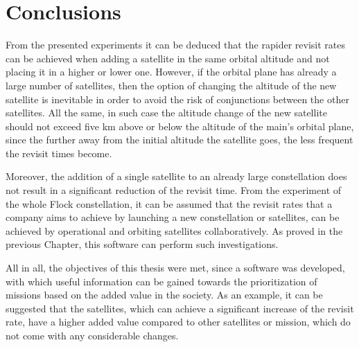
\bigskip
\section{Conclusions}
\bigskip

From the presented experiments it can be deduced that the rapider revisit rates can be achieved when adding a satellite in the same orbital altitude and not placing it in a higher or lower one. However, if the orbital plane has already a large number of satellites, then the option of changing the altitude of the new satellite is inevitable in order to avoid the risk of conjunctions between the other satellites. All the same, in such case the altitude change of the new satellite should not exceed five km above or below the altitude of the main's orbital plane, since the further away from the initial altitude the satellite goes, the less frequent the revisit times become.

Moreover, the addition of a single satellite to an already large constellation does not result in a significant reduction of the revisit time. From the experiment of the whole Flock constellation, it can be assumed that the revisit rates that a company aims to achieve by launching a new constellation or satellites, can be achieved by operational and orbiting satellites collaboratively. As proved in the previous Chapter, this software can perform such investigations.

\bigskip
All in all, the objectives of this thesis were met, since a software was developed, with which useful information can be gained towards the prioritization of missions based on the added value in the society. As an example, it can be suggested that the satellites, which can achieve a significant increase of the revisit rate, have a higher added value compared to other satellites or mission, which do not come with any considerable changes.

